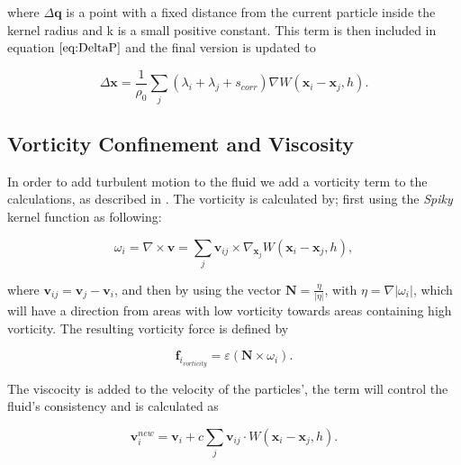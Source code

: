 where $\Delta \mathbf{q}$ is a point with a fixed distance from the current particle inside the kernel
radius and k is a small positive constant. This term is then included in
equation $\ref{eq:DeltaP}$ and the final version is updated to

\begin{equation}
\label{eq:DeltaPscorr}
\Delta \mathbf{x} = \frac{1}{\rho_0} \sum\limits_{j} (\lambda_i + \lambda_j + s_{corr}) \nabla W(\mathbf{x}_i - \mathbf{x}_j, h).
\end{equation}

\subsection{Vorticity Confinement and Viscosity} 
In order to add turbulent motion to the fluid we add a vorticity term to the calculations, as described in
\cite{macklin2013position}. The vorticity is calculated by; first using the
\textit{Spiky} kernel function as following:

\begin{equation}
\label{eq:Omega}
\omega_{i} = \nabla \times \mathbf{v} =  \sum\limits_{j} \mathbf{v}_{ij} \times \nabla_{\mathbf{x}_{j}} W(\mathbf{x}_{i} - \mathbf{x}_{j}, h),
\end{equation}

where $\mathbf{v}_{ij} = \mathbf{v}_{j} - \mathbf{v}_{i}$, and then by using the
vector $\mathbf{N} = \frac{\eta}{|\eta|}$, with $\eta = \nabla|\omega_{i}|$,
which will have a direction from areas with low vorticity towards areas
containing high vorticity. The resulting vorticity force is defined by

\begin{equation}
\label{eq:Vorticity}
\mathbf{f}_{i_{vorticity}} = \varepsilon \left(\mathbf{N} \times \omega_{i} \right).
\end{equation}

The viscocity is added to the velocity of the particles', the term
will control the fluid's consistency and is calculated as

\begin{equation}
\label{eq:Viscosity}
\mathbf{v}_{i}^{new} = \mathbf{v}_{i} + c \sum\limits_{j} \mathbf{v}_{ij} \cdot W(\mathbf{x}_i - \mathbf{x}_j, h).
\end{equation}

